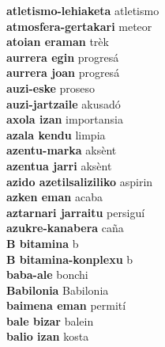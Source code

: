 \textbf{ atletismo-lehiaketa  } atletismo \\
\textbf{ atmosfera-gertakari  } meteor \\
\textbf{ atoian eraman  } trèk \\
\textbf{ aurrera egin  } progresá \\
\textbf{ aurrera joan  } progresá \\
\textbf{ auzi-eske  } proseso \\
\textbf{ auzi-jartzaile  } akusadó \\
\textbf{ axola izan  } importansia \\
\textbf{ azala kendu  } limpia \\
\textbf{ azentu-marka  } aksènt \\
\textbf{ azentua jarri  } aksènt \\
\textbf{ azido azetilsaliziliko  } aspirin \\
\textbf{ azken eman  } acaba \\
\textbf{ aztarnari jarraitu  } persiguí \\
\textbf{ azukre-kanabera  } caña \\
\textbf{ B bitamina  } b \\
\textbf{ B bitamina-konplexu  } b \\
\textbf{ baba-ale  } bonchi \\
\textbf{ Babilonia  } Babilonia \\
\textbf{ baimena eman  } permití \\
\textbf{ bale bizar  } balein \\
\textbf{ balio izan  } kosta \\
